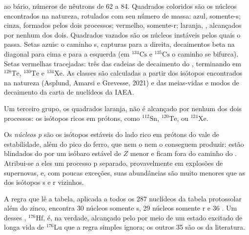 \begin{omfigure}
{ao bário, números de nêutrons de 62 a 84. Quadrados coloridos são os núcleos encontrados na natureza, rotulados
com seu número de massa: azul, somente-s; cinza, formados pelos dois processos; vermelho,
somente-r; laranja, , alcançados por nenhum dos dois. Quadrados vazados são os
núcleos instáveis pelos quais o  passa. Setas azuis: o caminho s,
capturas para a direita, decaimentos beta na diagonal para cima e para a esquerda (em
$^{134}\mathrm{Cs}$ e $^{135}\mathrm{Cs}$ o caminho se bifurca). Setas vermelhas
tracejadas: três das cadeias de decaimento do , terminando em
$^{128}\mathrm{Te}$, $^{130}\mathrm{Te}$ e $^{134}\mathrm{Xe}$. As
classes são calculadas a partir dos isótopos encontrados na natureza (Asplund,
Amarsi e Grevesse, 2021) e das meias-vidas e modos de decaimento da
carta de nuclídeos da IAEA.}\label{fig:b3:origin-of-elements:chart}
\end{omfigure}

Um terceiro grupo, os quadrados laranja, não é alcançado por nenhum dos dois processos: os
isótopos ricos em prótons, como $^{112}\mathrm{Sn}$, $^{120}\mathrm{Te}$,
ou $^{124}\mathrm{Xe}$.

\begin{definition}[núcleos p]\label{def:b3:origin-of-elements:p-process}
Os \emph{núcleos p} são os isótopos estáveis do
lado rico em prótons do vale de estabilidade, além do pico do ferro, que
nem o  nem o  conseguem produzir: estão blindados do 
por um isóbaro estável de $Z$ menor e ficam fora do caminho do . Atribui-se
a eles um processo p separado, provavelmente em explosões de supernovas, e,
com poucas exceções, suas abundâncias são muito menores que as dos
isótopos s e r vizinhos.
\end{definition}

A regra que lê a tabela, aplicada a todos os 287 nuclídeos da
tabela protossolar além do zinco, encontra 30 núcleos somente s, 29 núcleos somente r
e 36 . Um desses , $^{176}\mathrm{Hf}$, é, na verdade,
alcançado pelo  por meio de um estado excitado de longa vida de
$^{176}\mathrm{Lu}$ que a regra simples ignora; os outros 35 são os 
da literatura.

